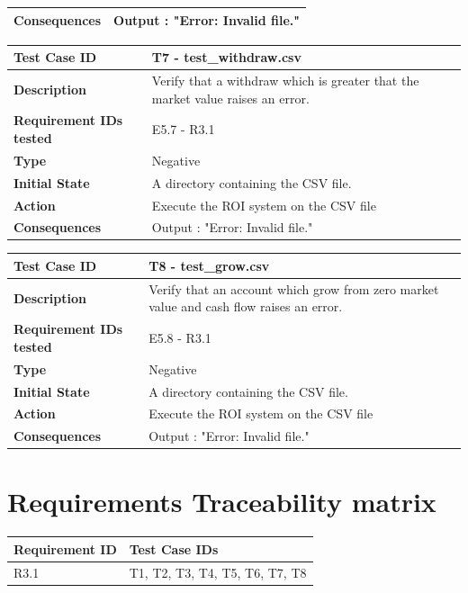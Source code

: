 \documentclass[runningheads,12pt]{article}
\begin{document}
{\begin{tabular}{|p{1.2in}|p{4in}|}
\textbf{Consequences} & Output : "Error: Invalid file." \\ 
\hline
\end{tabular}
\bigskip
\centering
\begin{tabular}{|p{1.2in}|p{4in}|}
\hline
\textbf{Test Case ID} & T7 - test\_withdraw.csv \\ 
\hline
\textbf{Description} & Verify that a withdraw which is greater that the market value raises an error.\\
\hline
\textbf{Requirement IDs tested} & E5.7 - R3.1 \\ 
\hline
\textbf{Type} & Negative \\ 
\hline
\textbf{Initial State} & A directory containing the CSV file.\\
\hline 
\textbf{Action} & Execute the ROI system on the CSV file \\
\hline 
\textbf{Consequences} & Output : "Error: Invalid file." \\ 
\hline
\end{tabular}
\bigskip
\centering
\begin{tabular}{|p{1.2in}|p{4in}|}
\hline
\textbf{Test Case ID} & T8 - test\_grow.csv \\ 
\hline
\textbf{Description} & Verify that an account which grow from zero market value and cash flow raises an error.\\
\hline
\textbf{Requirement IDs tested} & E5.8 - R3.1 \\ 
\hline
\textbf{Type} & Negative \\ 
\hline
\textbf{Initial State} & A directory containing the CSV file.\\
\hline 
\textbf{Action} & Execute the ROI system on the CSV file \\
\hline 
\textbf{Consequences} & Output : "Error: Invalid file." \\ 
\hline
\end{tabular}
}







\section{Requirements Traceability matrix}

\begin{tabular}{|p{1.5in}|p{3.5in}|}
\hline
\textbf{Requirement ID}	 & \textbf{Test Case IDs}\\ 
\hline
R3.1 & T1, T2, T3, T4, T5, T6, T7, T8\\
\hline
\end{tabular}
\end{document}
